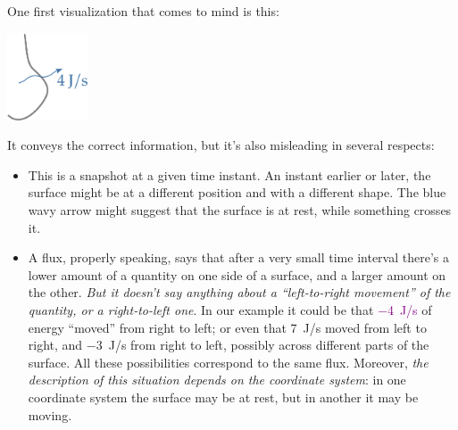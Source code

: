 \documentclass[a4paper,12pt,%
onecolumn,oneside,titlepage,%
british%
]{memoir}
\renewcommand*{\|}[1][]{\nonscript\:#1\vert\nonscript\:\mathopen{}}
\begin{document}
One first visualization that comes to mind is this:
\begin{center}
  \includegraphics[align=c,height=7em]{flux_2J.pdf}
\end{center}
It conveys the correct information, but it's also misleading in several respects:
\begin{itemize}[para]
\item This is a snapshot at a given time instant. An instant earlier or later, the surface might be at a different position and with a different shape. The \textcolor{bluepurple}{blue wavy arrow} might suggest that the surface is at rest, while something crosses it.

\item A flux, properly speaking,
says that after a very small time interval there's a lower amount of a quantity on one side of a surface, and a larger amount on the other. \emph{But it doesn't say anything about a \enquote{left-to-right movement} of the quantity, or a right-to-left one}. In our example it could be that \textcolor{purple}{\qty{-4}{J/s}} of energy \enquote{moved} from right to left; or even that \qty{+7}{J/s} moved from left to right, and \qty{-3}{J/s} from right to left, possibly across different parts of the surface. All these possibilities correspond to the same flux. Moreover, \emph{the description of this situation depends on the coordinate system}: in one coordinate system the surface may be at rest, but in another it may be moving.
\end{itemize}
\end{document}
